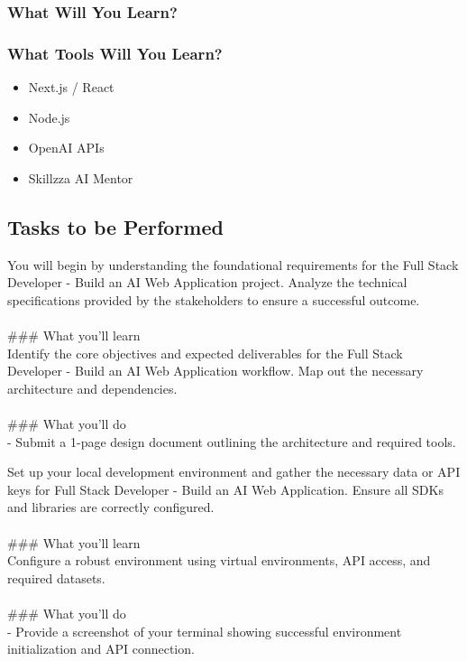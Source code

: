 \documentclass{article}
\begin{document}
\subsubsection*{What Will You Learn?}
\begin{itemize}
\end{itemize}

\subsubsection*{What Tools Will You Learn?}
\begin{itemize}
    \item Next.js / React
    \item Node.js
    \item OpenAI APIs
    \item Skillzza AI Mentor
\end{itemize}

\subsection*{Tasks to be Performed}
You will begin by understanding the foundational requirements for the Full Stack Developer - Build an AI Web Application project. Analyze the technical specifications provided by the stakeholders to ensure a successful outcome. \\
 \\
### What you'll learn \\
Identify the core objectives and expected deliverables for the Full Stack Developer - Build an AI Web Application workflow. Map out the necessary architecture and dependencies. \\
 \\
### What you'll do \\
- Submit a 1-page design document outlining the architecture and required tools.

Set up your local development environment and gather the necessary data or API keys for Full Stack Developer - Build an AI Web Application. Ensure all SDKs and libraries are correctly configured. \\
 \\
### What you'll learn \\
Configure a robust environment using virtual environments, API access, and required datasets. \\
 \\
### What you'll do \\
- Provide a screenshot of your terminal showing successful environment initialization and API connection.
\end{document}
